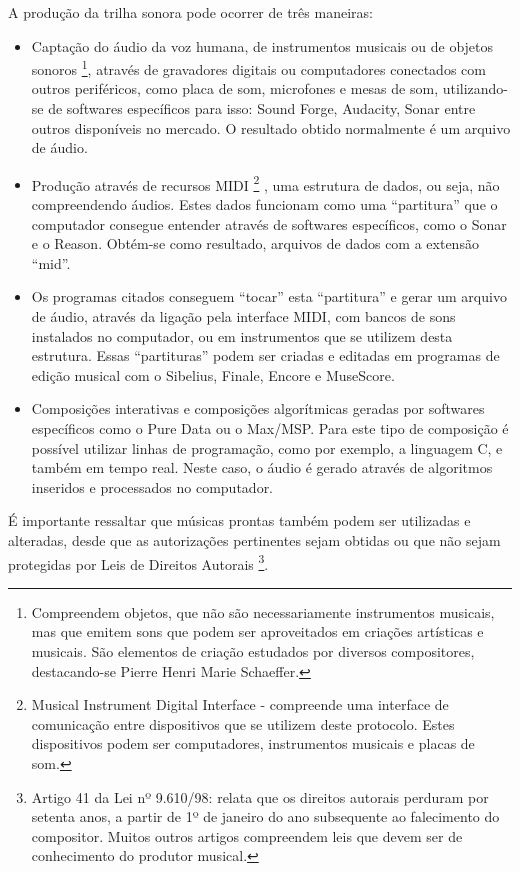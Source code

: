 A produção da trilha sonora pode ocorrer de três maneiras:
\begin{itemize}
\item Captação do áudio da voz humana, de instrumentos musicais ou de
 objetos sonoros
\footnote{Compreendem objetos, que não são necessariamente instrumentos
 musicais, mas que emitem sons que podem ser aproveitados em criações
 artísticas e musicais. São elementos de criação estudados por diversos 
compositores, destacando-se Pierre Henri Marie Schaeffer.}, 
através de gravadores digitais ou computadores conectados com outros
 periféricos, como placa de som, microfones e mesas de som, utilizando-se
 de softwares específicos para isso: Sound Forge, Audacity, Sonar entre 
outros disponíveis no mercado. O resultado obtido normalmente é um 
arquivo de áudio.
\item Produção através de recursos MIDI
\footnote{Musical Instrument Digital Interface - compreende uma interface
 de comunicação entre dispositivos que se utilizem deste protocolo. 
Estes dispositivos podem ser computadores, instrumentos musicais e 
placas de som.}
, uma estrutura de dados, ou seja, não compreendendo áudios. Estes 
dados funcionam como uma ``partitura'' que o computador consegue
 entender através de softwares específicos, como o Sonar e o Reason. 
Obtém-se como resultado, arquivos de dados com a extensão ``mid''.
\item Os programas citados conseguem ``tocar'' esta ``partitura'' e 
gerar um arquivo de áudio, através da ligação pela interface MIDI, com 
bancos de sons instalados no computador, ou em instrumentos que se 
utilizem desta estrutura. Essas ``partituras'' podem ser criadas e 
editadas em programas de edição musical com o Sibelius, Finale, Encore
 e MuseScore.
\item Composições interativas e composições algorítmicas geradas por
 softwares específicos como o Pure Data ou o Max/MSP. Para este tipo 
de composição é possível utilizar linhas de programação, como por 
exemplo, a linguagem C, e também em tempo real. Neste caso, o áudio 
é gerado através de algoritmos inseridos e processados no computador.
\end{itemize}

É importante ressaltar que músicas prontas também podem ser utilizadas
 e alteradas, desde que as autorizações pertinentes sejam obtidas ou 
que não sejam protegidas por Leis de Direitos Autorais
\footnote{Artigo 41 da Lei nº 9.610/98: relata que os direitos autorais 
perduram por setenta anos, a partir de 1º de janeiro do ano subsequente
 ao falecimento do compositor. Muitos outros artigos compreendem leis 
que devem ser de conhecimento do produtor musical.}. 

